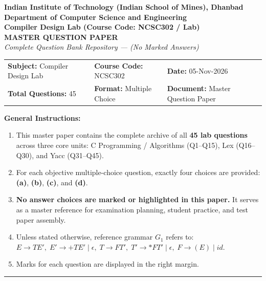 \documentclass[11pt,a4paper]{article}
\begin{document}
\footnotesize

\begin{center}
{\large \textbf{Indian Institute of Technology (Indian School of Mines), Dhanbad}}\\[2.5pt]
{\normalsize \textbf{Department of Computer Science and Engineering}}\\[2.5pt]
{\normalsize \textbf{Compiler Design Lab (Course Code: NCSC302 / Lab)}}\\[3pt]
{\large \textbf{MASTER QUESTION PAPER}}\\[2pt]
\textit{Complete Question Bank Repository --- (No Marked Answers)}\\[4pt]
\end{center}

\noindent
\begin{tabular*}{\textwidth}{@{\extracolsep{\fill}}lll}
\textbf{Subject:} Compiler Design Lab & \textbf{Course Code:} NCSC302 & \textbf{Date:} 05-Nov-2026 \\
\textbf{Total Questions:} 45 & \textbf{Format:} Multiple Choice & \textbf{Document:} Master Question Paper \\
\end{tabular*}

\vspace{0.2cm}
\noindent\textbf{General Instructions:}
\begin{enumerate}\setlength{\itemsep}{0pt}\setlength{\parskip}{0pt}
\item This master paper contains the complete archive of all \textbf{45 lab questions} across three core units: C Programming / Algorithms (Q1--Q15), Lex (Q16--Q30), and Yacc (Q31--Q45).
\item For each objective multiple-choice question, exactly four choices are provided: \textbf{(a)}, \textbf{(b)}, \textbf{(c)}, and \textbf{(d)}.
\item \textbf{No answer choices are marked or highlighted in this paper.} It serves as a master reference for examination planning, student practice, and test paper assembly.
\item Unless stated otherwise, reference grammar $G_1$ refers to:
  $E \rightarrow TE',\; E' \rightarrow +TE' \mid \epsilon,\; T \rightarrow FT',\; T' \rightarrow *FT' \mid \epsilon,\; F \rightarrow (E) \mid id$.
\item Marks for each question are displayed in the right margin.
\end{enumerate}

\vspace{0.1cm}
\noindent\rule{\textwidth}{0.6pt}
\vspace{0.2cm}
\end{document}
